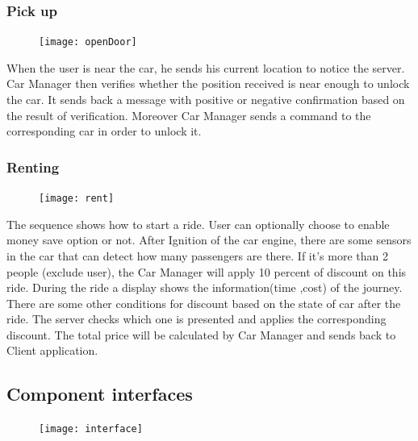 \documentclass{article}
\begin{document}
	\subsubsection{Pick up}
	\begin{figure}[h]
		\texttt{[image: openDoor]}
	\end{figure}
	When the user is near the car, he sends his current location to notice the server. Car Manager then verifies whether the position received is  near enough to unlock the car. It sends back a message with positive or negative confirmation based on the result of verification. Moreover  Car Manager sends a command to the corresponding car in order to unlock it.
	
	\newpage

	\subsubsection{Renting}
	\begin{figure}[h]
		\texttt{[image: rent]}
	\end{figure}
	\newpage
	The sequence  shows how to start a ride.  User can optionally  choose to enable money save option or not. After Ignition of the car engine, there are some sensors in the car that can detect how many passengers are there.  If it's more than 2 people (exclude user), the Car Manager will apply 10 percent of discount on this ride. During the ride a display shows the information(time ,cost) of the journey. There are some other conditions for discount based on the state of car after the ride. The server checks which one is presented and applies the corresponding discount. The total price will be calculated by Car Manager and sends back to Client application.

	\subsection{Component interfaces}
	\begin{figure}[h]
		\texttt{[image: interface]}
	\end{figure}
\end{document}
